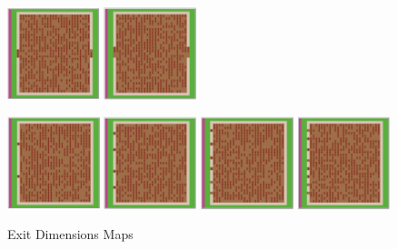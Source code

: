 \documentclass[12pt,letterpaper]{article}
\begin{document}
\begin{figure}[ht]
\begin{minipage}[b]{.75\linewidth}
    \includegraphics[width=0.24\textwidth]{./figures/exit_dims_6_b.png}
    \includegraphics[width=0.24\textwidth]{./figures/exit_dims_8_b.png}
  \end{minipage}
  \begin{minipage}[b]{.75\linewidth}
    \includegraphics[width=0.24\textwidth]{./figures/exit_dims_2_c.png}
    \includegraphics[width=0.24\textwidth]{./figures/exit_dims_4_c.png}
    \includegraphics[width=0.24\textwidth]{./figures/exit_dims_6_c.png}
    \includegraphics[width=0.24\textwidth]{./figures/exit_dims_8_c.png}
  \end{minipage}

  \caption{Exit Dimensions Maps}
\end{figure}
\end{document}
